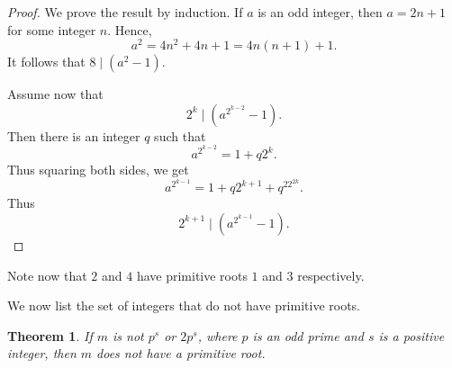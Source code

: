 \documentclass[12pt,letterpaper]{book}
\newtheorem{theorem}{Theorem}
\begin{document}
\begin{proof}
We prove the result by induction.  If $a$ is an odd integer, then
$a=2n+1$ for some integer $n$.  Hence,
\begin{equation*}
a^2=4n^2+4n+1=4n(n+1)+1.
\end{equation*}
It follows that $8\mid (a^2-1)$.\\
\par Assume now that
\begin{equation*}
2^k\mid (a^{2^{k-2}}-1).
\end{equation*}
Then there is an integer $q$ such that
\begin{equation*}
a^{2^{k-2}}=1+q2^{k}.
\end{equation*}
Thus squaring both sides, we get
\begin{equation*}
a^{2^{k-1}}=1+q2^{k+1}+q^22^{2k}.
\end{equation*}
Thus
\begin{equation*}
2^{k+1}\mid (a^{2^{k-1}}-1).
\end{equation*}
\end{proof}

Note now that $2$ and $4$ have primitive roots $1$ and $3$ respectively.
\par We now list the set of integers that do not have primitive
roots.

\begin{theorem}\label{Primitive2}
If $m$ is not $p^s$ or  $2p^s$, where $p$ is an odd prime and $s$ is a positive integer, then $m$ does not have a primitive
root.
\end{theorem}
\end{document}
